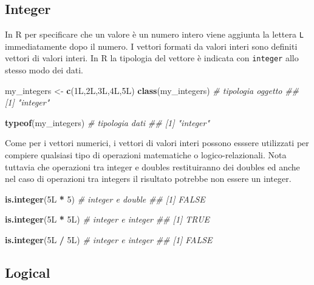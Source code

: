 \documentclass[
]{book}
\newenvironment{Shaded}{\begin{snugshade}}{\end{snugshade}}
\newcommand{\CommentTok}[1]{\textcolor[rgb]{0.56,0.35,0.01}{\textit{#1}}}
\newcommand{\DecValTok}[1]{\textcolor[rgb]{0.00,0.00,0.81}{#1}}
\newcommand{\KeywordTok}[1]{\textcolor[rgb]{0.13,0.29,0.53}{\textbf{#1}}}
\newcommand{\NormalTok}[1]{#1}
\newcommand{\OperatorTok}[1]{\textcolor[rgb]{0.81,0.36,0.00}{\textbf{#1}}}
\newcommand{\StringTok}[1]{\textcolor[rgb]{0.31,0.60,0.02}{#1}}
\begin{document}
\hypertarget{integer}{%
\subsection{Integer}\label{integer}}

In R per specificare che un valore è un numero intero viene aggiunta la lettera \texttt{L} immediatamente dopo il numero. I vettori formati da valori interi sono definiti vettori di valori interi. In R la tipologia del vettore è indicata con \texttt{integer} allo stesso modo dei dati.

\begin{Shaded}
\begin{Highlighting}[]
\NormalTok{my_integers <-}\StringTok{ }\KeywordTok{c}\NormalTok{(1L,2L,3L,4L,5L)}
\KeywordTok{class}\NormalTok{(my_integers)  }\CommentTok{# tipologia oggetto}
\CommentTok{## [1] "integer"}

\KeywordTok{typeof}\NormalTok{(my_integers) }\CommentTok{# tipologia dati}
\CommentTok{## [1] "integer"}
\end{Highlighting}
\end{Shaded}

Come per i vettori numerici, i vettori di valori interi possono esssere utilizzati per compiere qualsiasi tipo di operazioni matematiche o logico-relazionali. Nota tuttavia che operazioni tra integer e doubles restituiranno dei doubles ed anche nel caso di operazioni tra integers il risultato potrebbe non essere un integer.

\begin{Shaded}
\begin{Highlighting}[]
\KeywordTok{is.integer}\NormalTok{(5L }\OperatorTok{*}\StringTok{ }\DecValTok{5}\NormalTok{)   }\CommentTok{# integer e double}
\CommentTok{## [1] FALSE}

\KeywordTok{is.integer}\NormalTok{(5L }\OperatorTok{*}\StringTok{ }\NormalTok{5L)  }\CommentTok{# integer e integer}
\CommentTok{## [1] TRUE}

\KeywordTok{is.integer}\NormalTok{(5L }\OperatorTok{/}\StringTok{ }\NormalTok{5L)  }\CommentTok{# integer e integer}
\CommentTok{## [1] FALSE}
\end{Highlighting}
\end{Shaded}

\hypertarget{logical}{%
\subsection{Logical}\label{logical}}
\end{document}
